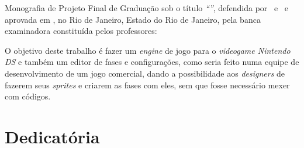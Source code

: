 \documentclass[brazil]{abnt}
\begin{document}

\Ncapa
\NFolhaDeRosto

\begin{folhadeaprovacao}
Monografia de Projeto Final de Graduação sob o título \textit{``\ABNTtitulodata''},
defendida por \ABNTautordata~e \ABNTcoautordata~e aprovada em \ABNTdatadata, no Rio de Janeiro,
Estado do Rio de Janeiro, pela banca examinadora constituída pelos
professores: \setlength{\ABNTsignthickness}{0.4pt}

  
\end{folhadeaprovacao}

\begin{resumo}
O objetivo deste trabalho é fazer um \textit{engine} de jogo para o \textit{videogame Nintendo DS\texttrademark} e também um editor de fases 
e configurações, como seria feito numa equipe de desenvolvimento de um jogo comercial, dando a possibilidade aos \textit{designers} 
de fazerem seus \textit{sprites} e criarem as fases com eles, sem que fosse necessário mexer com códigos.
\end{resumo}

\begin{abstract}
The objective of this paper is to make a game engine to the Nintendo DS\texttrademark system and a level and configurations editor, as it
would be done in a development team in a comercial game, giving designers the possibility to make their sprites and create their levels 
without touching actual source code.
\end{abstract}

\chapter*{Dedicatória}
\end{document}

